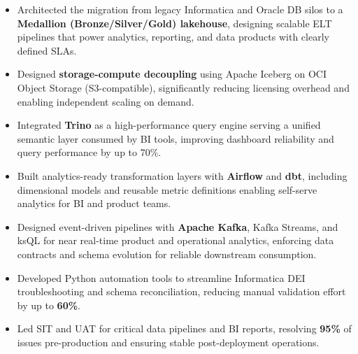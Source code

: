 

\begin{itemize}
  \item Architected the migration from legacy Informatica and Oracle DB silos to a
        \textbf{Medallion (Bronze/Silver/Gold) lakehouse}, designing scalable ELT pipelines
        that power analytics, reporting, and data products with clearly defined SLAs.

  \item Designed \textbf{storage-compute decoupling} using Apache Iceberg on OCI Object
        Storage (S3-compatible), significantly reducing licensing overhead and enabling
        independent scaling on demand.

  \item Integrated \textbf{Trino} as a high-performance query engine serving a unified
        semantic layer consumed by BI tools, improving dashboard reliability and query
        performance by up to 70\%.

  \item Built analytics-ready transformation layers with \textbf{Airflow} and \textbf{dbt},
        including dimensional models and reusable metric definitions enabling self-serve
        analytics for BI and product teams.

  \item Designed event-driven pipelines with \textbf{Apache Kafka}, Kafka Streams, and ksQL
        for near real-time product and operational analytics, enforcing data contracts and
        schema evolution for reliable downstream consumption.

  \item Developed Python automation tools to streamline Informatica DEI troubleshooting and
        schema reconciliation, reducing manual validation effort by up to \textbf{60\%}.

  \item Led SIT and UAT for critical data pipelines and BI reports, resolving \textbf{95\%}
        of issues pre-production and ensuring stable post-deployment operations.
\end{itemize}
